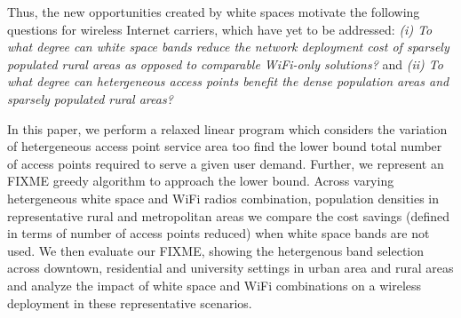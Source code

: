 Thus, the new opportunities created by white spaces motivate the following 
questions for wireless Internet carriers, which have yet to be addressed: 
{\it (i) To what degree can white space bands reduce the network deployment cost of
sparsely populated rural areas as opposed to comparable WiFi-only solutions?} and 
{\it (ii) To what degree can hetergeneous access points benefit the dense 
population areas and sparsely populated rural areas?}

In this paper, we perform a relaxed linear program which considers the 
variation of hetergeneous access point service area too find the lower bound
total number of access points required to serve a given user demand. Further,
we represent an FIXME greedy algorithm to approach the lower bound.  
Across varying hetergeneous white space and WiFi radios combination, population 
densities in representative rural and metropolitan areas we compare the 
cost savings (defined in terms of number of access points reduced) when 
white space bands are not used. We then evaluate our FIXME, showing
the hetergenous band selection across downtown, residential and university settings in
urban area and rural areas and analyze the impact of white space and WiFi
combinations on a wireless deployment in these representative scenarios.






